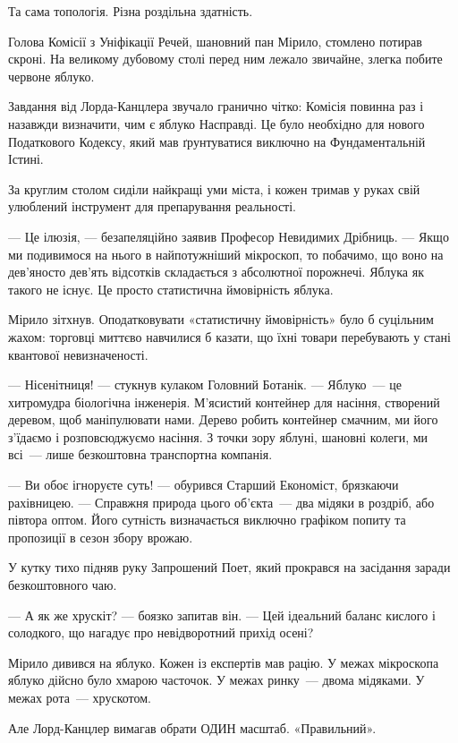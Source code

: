 \documentclass[12pt, a4paper, openany]{book}
\begin{document}
Та сама топологія. Різна роздільна здатність.


\begin{terrybox}
Голова Комісії з Уніфікації Речей, шановний пан Мірило, стомлено потирав скроні. На великому дубовому столі перед ним лежало звичайне, злегка побите червоне яблуко.

Завдання від Лорда-Канцлера звучало гранично чітко: Комісія повинна раз і назавжди визначити, чим є яблуко Насправді. Це було необхідно для нового Податкового Кодексу, який мав ґрунтуватися виключно на Фундаментальній Істині.

За круглим столом сиділи найкращі уми міста, і кожен тримав у руках свій улюблений інструмент для препарування реальності.

--- Це ілюзія, --- безапеляційно заявив Професор Невидимих Дрібниць. --- Якщо ми подивимося на нього в найпотужніший мікроскоп, то побачимо, що воно на дев'яносто дев'ять відсотків складається з абсолютної порожнечі. Яблука як такого не існує. Це просто статистична ймовірність яблука.

Мірило зітхнув. Оподатковувати «статистичну ймовірність» було б суцільним жахом: торговці миттєво навчилися б казати, що їхні товари перебувають у стані квантової невизначеності.

--- Нісенітниця! --- стукнув кулаком Головний Ботанік. --- Яблуко~--- це хитромудра біологічна інженерія. М'ясистий контейнер для насіння, створений деревом, щоб маніпулювати нами. Дерево робить контейнер смачним, ми його з'їдаємо і розповсюджуємо насіння. З точки зору яблуні, шановні колеги, ми всі~--- лише безкоштовна транспортна компанія.

--- Ви обоє ігноруєте суть! --- обурився Старший Економіст, брязкаючи рахівницею. --- Справжня природа цього об'єкта~--- два мідяки в роздріб, або півтора оптом. Його сутність визначається виключно графіком попиту та пропозиції в сезон збору врожаю.

У кутку тихо підняв руку Запрошений Поет, який прокрався на засідання заради безкоштовного чаю.

--- А як же хрускіт? --- боязко запитав він. --- Цей ідеальний баланс кислого і солодкого, що нагадує про невідворотний прихід осені?

\medskip
Мірило дивився на яблуко. Кожен із експертів мав рацію. У межах мікроскопа яблуко дійсно було хмарою часточок. У межах ринку~--- двома мідяками. У межах рота~--- хрускотом.

Але Лорд-Канцлер вимагав обрати ОДИН масштаб. «Правильний».


\end{terrybox}
\end{document}
